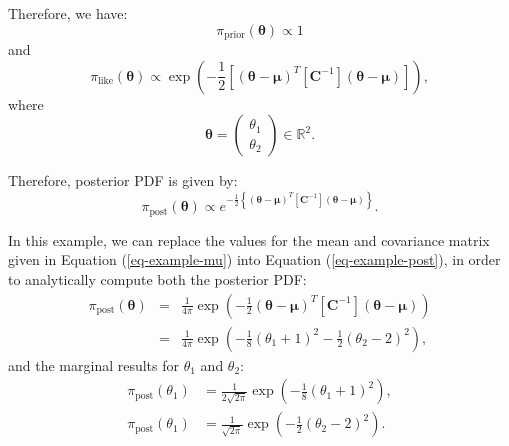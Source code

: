 Therefore, we have: 
\begin{equation*}
\pi_{\text{prior}}(\boldsymbol{\theta}) \varpropto 1
\end{equation*}
and
\begin{equation*}
\pi_{\text{like}}(\boldsymbol{\theta}) \varpropto \exp \left(-\frac{1}{2}\left[(\boldsymbol{\theta}-\boldsymbol{\mu})^T[\mathbf{C}^{-1}](\boldsymbol{\theta}-\boldsymbol{\mu})\right] \right),
\end{equation*}
where
\begin{equation*}
\boldsymbol{\theta} = 
\left(
\begin{array}{c}
\theta_1 \\
\theta_2
\end{array}
\right)\in \mathbb{R}^2.
\end{equation*}
%

Therefore,  posterior PDF is given by:
\begin{equation}\label{eq-example-post}
\pi_{\text{post}}(\boldsymbol{\theta}) \varpropto e^{-\frac{1}{2}\left\{(\boldsymbol{\theta}-\boldsymbol{\mu})^T[\mathbf{C}^{-1}](\boldsymbol{\theta}-\boldsymbol{\mu})\right\}}.
\end{equation}


In this example, we can replace the values for the mean and covariance matrix given in Equation (\ref{eq-example-mu}) into Equation (\ref{eq-example-post}), 
in order to analytically compute both the posterior PDF:
\begin{eqnarray*}\label{eq-example-exact-post}
\pi_{\text{post}}(\boldsymbol{\theta}) & = & \frac{1}{4\pi} \exp\left(-\frac{1}{2}(\boldsymbol{\theta}-\boldsymbol{\mu})^T[\mathbf{C}^{-1}](\boldsymbol{\theta}-\boldsymbol{\mu})\right) \\
                                       & = & \frac{1}{4\pi} \exp\left( -\frac{1}{8}(\theta_1+1)^2 - \frac{1}{2}(\theta_2-2)^2\right), \label{eq-example-exact-joint}
\end{eqnarray*}
and the marginal results for $\theta_1$ and $\theta_2$:
\begin{equation}\label{eq-example-exact-marginal}
\begin{split}
\pi_{\text{post}}(\theta_1) & =  \frac{1}{2\sqrt{2\pi}} \exp\left(-\frac{1}{8}(\theta_1+1)^2 \right), \\
\pi_{\text{post}}(\theta_1) & =  \frac{1}{ \sqrt{2\pi}} \exp\left(-\frac{1}{2}(\theta_2-2)^2 \right). 
\end{split}
\end{equation}



